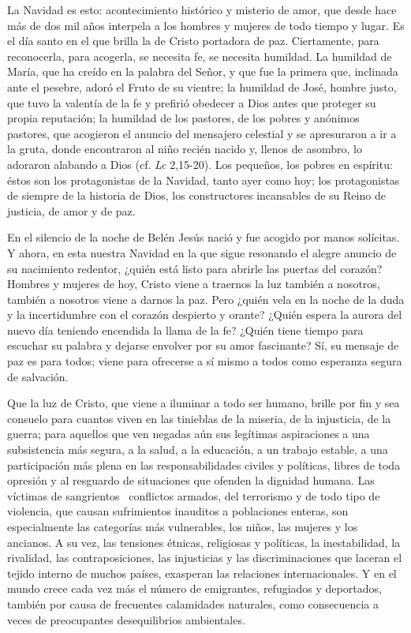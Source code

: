 La Navidad es esto: acontecimiento histórico y misterio de amor, que desde hace más de dos mil años interpela a los hombres y mujeres de todo tiempo y lugar. Es el día santo en el que brilla la  de Cristo portadora de paz. Ciertamente, para reconocerla, para acogerla, se necesita fe, se necesita humildad. La humildad de María, que ha creído en la palabra del Señor, y que fue la primera que, inclinada ante el pesebre, adoró el Fruto de su vientre; la humildad de José, hombre justo, que tuvo la valentía de la fe y prefirió obedecer a Dios antes que proteger su propia reputación; la humildad de los pastores, de los pobres y anónimos pastores, que acogieron el anuncio del mensajero celestial y se apresuraron a ir a la gruta, donde encontraron al niño recién nacido y, llenos de asombro, lo adoraron alabando a Dios (cf. \emph{Lc} 2,15-20). Los pequeños, los pobres en espíritu: éstos son los protagonistas de la Navidad, tanto ayer como hoy; los protagonistas de siempre de la historia de Dios, los constructores incansables de su Reino de justicia, de amor y de paz.

En el silencio de la noche de Belén Jesús nació y fue acogido por manos solícitas. Y ahora, en esta nuestra Navidad en la que sigue resonando el alegre anuncio de su nacimiento redentor, ¿quién está listo para abrirle las puertas del corazón? Hombres y mujeres de hoy, Cristo viene a traernos la luz también a nosotros, también a nosotros viene a darnos la paz. Pero ¿quién vela en la noche de la duda y la incertidumbre con el corazón despierto y orante? ¿Quién espera la aurora del nuevo día teniendo encendida la llama de la fe? ¿Quién tiene tiempo para escuchar su palabra y dejarse envolver por su amor fascinante? Sí, su mensaje de paz es para todos; viene para ofrecerse a sí mismo a todos como esperanza segura de salvación.

Que la luz de Cristo, que viene a iluminar a todo ser humano, brille por fin y sea consuelo para cuantos viven en las tinieblas de la miseria, de la injusticia, de la guerra; para aquellos que ven negadas aún sus legítimas aspiraciones a una subsistencia más segura, a la salud, a la educación, a un trabajo estable, a una participación más plena en las responsabilidades civiles y políticas, libres de toda opresión y al resguardo de situaciones que ofenden la dignidad humana. Las víctimas de sangrientos~ conflictos armados, del terrorismo y de todo tipo de violencia, que causan sufrimientos inauditos a poblaciones enteras, son especialmente las categorías más vulnerables, los niños, las mujeres y los ancianos. A su vez, las tensiones étnicas, religiosas y políticas, la inestabilidad, la rivalidad, las contraposiciones, las injusticias y las discriminaciones que laceran el tejido interno de muchos países, exasperan las relaciones internacionales. Y en el mundo crece cada vez más el número de emigrantes, refugiados y deportados, también por causa de frecuentes calamidades naturales, como consecuencia a veces de preocupantes desequilibrios ambientales.

